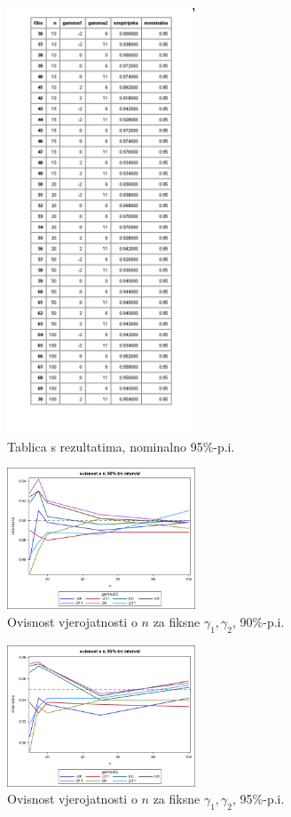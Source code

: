 \documentclass[11pt]{scrartcl}
\begin{document}
\begin{figure}[h]
	\centering
	\includegraphics[width=0.5\textwidth]{assets/tablica95.png}
	\caption{Tablica s rezultatima, nominalno 95\%-p.i.}
	\label{tablica95}
\end{figure}


\begin{figure}[h]
	\centering
	\includegraphics[width=0.5\textwidth]{assets/grafn90.png}
	\caption{Ovisnost vjerojatnosti o \( n \) za fiksne \( \gamma_1, \gamma_2 \), 90\%-p.i.}
	\label{grafn90}
\end{figure}


\begin{figure}[h]
	\centering
	\includegraphics[width=0.5\textwidth]{assets/grafn95.png}
	\caption{Ovisnost vjerojatnosti o \( n \) za fiksne \( \gamma_1, \gamma_2 \), 95\%-p.i.}
	\label{grafn95}
\end{figure}
\end{document}
